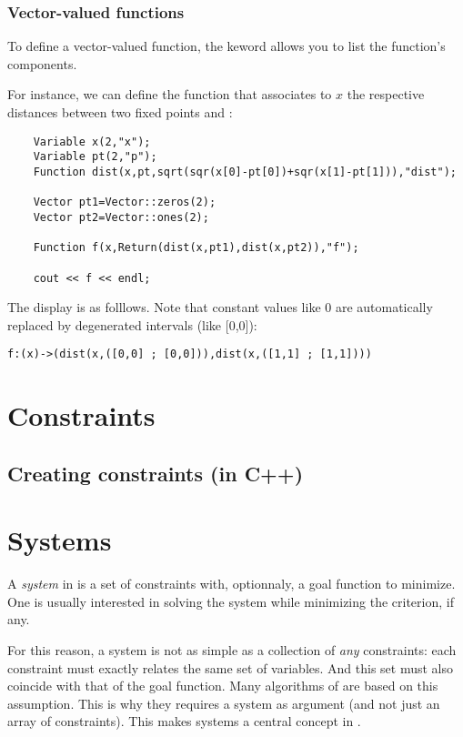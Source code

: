 \subsubsection{Vector-valued functions}

To define a vector-valued function, the  keword allows
you to list the function's components.

For instance, we can define the function that associates to $x$ the 
respective distances between two fixed points  and :

\begin{lstlisting}	
	Variable x(2,"x");
	Variable pt(2,"p");
	Function dist(x,pt,sqrt(sqr(x[0]-pt[0])+sqr(x[1]-pt[1])),"dist");

	Vector pt1=Vector::zeros(2);
	Vector pt2=Vector::ones(2);

	Function f(x,Return(dist(x,pt1),dist(x,pt2)),"f");

	cout << f << endl;
\end{lstlisting}

The display is as folllows. Note that constant values like 0 are automatically replaced
by degenerated intervals (like [0,0]):
\begin{verbatim}
f:(x)->(dist(x,([0,0] ; [0,0])),dist(x,([1,1] ; [1,1])))
\end{verbatim}

\section{Constraints}

\subsection{Creating constraints (in C++)}

\section{Systems}

A {\it system} in \ibex is a set of constraints with, optionnaly, a goal function to minimize.
One is usually interested in solving the system while minimizing the criterion, if any.

For this reason, a system is not as simple as a collection of {\it any} constraints:
each constraint must exactly relates the same set of variables. And this set must
also coincide with that of the goal function.
Many algorithms of \ibex are based on this assumption.
This is why they requires a system as argument (and not just an array of constraints).
This makes systems a central concept in \ibex.

